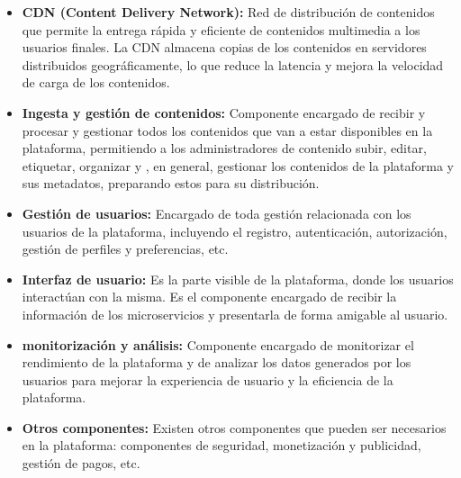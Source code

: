 \begin{itemize}
\item \textbf{CDN (Content Delivery Network):} Red de distribución de contenidos que permite la entrega
rápida y eficiente de contenidos multimedia a los usuarios finales. La CDN almacena copias de los contenidos
en servidores distribuidos geográficamente, lo que reduce la latencia y mejora la velocidad de carga de los
contenidos.
\item \textbf{Ingesta y gestión de contenidos:} Componente encargado de recibir y procesar y gestionar todos 
los contenidos que van a estar disponibles en la plataforma, permitiendo a los administradores de contenido
subir, editar, etiquetar, organizar y , en general, gestionar los contenidos de la plataforma y sus metadatos, 
preparando estos para su distribución.
\item \textbf{Gestión de usuarios:} Encargado de toda gestión relacionada con los usuarios de la plataforma,
incluyendo el registro, autenticación, autorización, gestión de perfiles y preferencias, etc.
\item \textbf{Interfaz de usuario:} Es la parte visible de la plataforma, donde los usuarios interactúan con
la misma. Es el componente encargado de recibir la información de los microservicios y presentarla de forma
amigable al usuario.
\item \textbf{monitorización y análisis:} Componente encargado de monitorizar el rendimiento de la plataforma
y de analizar los datos generados por los usuarios para mejorar la experiencia de usuario y la eficiencia de la
plataforma.
\item \textbf{Otros componentes:} Existen otros componentes que pueden ser necesarios en la plataforma: 
componentes de seguridad, monetización y publicidad, gestión de pagos, etc.
\end{itemize}






